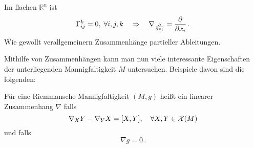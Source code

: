 \documentclass[../H_Analysis_main.tex]{subfiles}
\begin{document}
\begin{bsp}
Im flachen $\mathbb{R}^n$ ist
\begin{equation}
\Gamma_{ij}^k = 0, \; \forall i, j, k \quad \Rightarrow \quad \nabla_{\pdv{x_i}} = \pdv{x_i} \, .
\end{equation}
Wie gewollt verallgemeinern Zusammenhänge partieller Ableitungen.
\end{bsp}


\iffalse
{
Für die Gauß'schen Basisfelder gilt
\begin{equation}
\nabla_{\pdv{x_i}} \pdv{x_j} = \sum_{i, j, k} \Gamma_{ij}^k \pdv{x_k}
\end{equation}
für Funktionen $\Gamma_{ij}^k: U \rightarrow \mathbb{R}, U \subset M$, die \Def{Christoffelsymbole}. Diese bestimmen $\nabla$ bereits eindeutig, sind aber kein Tensor. Mithilfe dieser Zusammenhangskoeffizienten lässt sich dann die Wirkung von $\nabla_X$ auf ein weiteres Vektorfeld $Y$ lokal ausschreiben zu
\begin{equation}
\nabla_X Y = \sum_k X \cdot \mu_k \, \pdv{x_k} + \sum_{i, j, k} \lambda_i \mu_j \Gamma_{ij}^k \pdv{x_k} = \sum_{i, j, k} \qty(\lambda_i \pdv{\mu_j}{x_i} + \lambda_i \mu_j \Gamma_{ij}^k) \pdv{x_k}
\end{equation}
wobei $\lambda_i, \mu_j$ die Komponenten der lokalen Darstellungen von $X, Y$ sind. Der erste Term ist dabei die eigentliche Wirkung von $X$ auf $Y$ (Ableitung in Richtung von $X$) und der zweite Term mit den Christoffelsymbolen ist ein Beitrag der die Invarianz unter Koordinatenwechseln sicherstellt. Das ist daran zu erkennen, dass dieser Term nur die Koordinatendarstellungen $\lambda_i, \mu_j$ und keine Ableitungen davon enthält.\\

}
\fi


Mithilfe von Zusammenhängen kann man nun viele interessante Eigenschaften der unterliegenden Mannigfaltigkeit $M$ untersuchen. Beispiele davon sind die folgenden:
\begin{defi}
Für eine Riemmansche Mannigfaltigkeit $(M, g)$ heißt ein linearer Zusammenhang $\nabla$  falls
\begin{equation}
\nabla_X Y - \nabla_Y X = \qty[X, Y], \quad \forall X, Y \in \mathcal{X}(M)
\end{equation}
und  falls
\begin{equation}
\nabla g = 0 \, .
\end{equation}
\end{defi}
\end{document}
